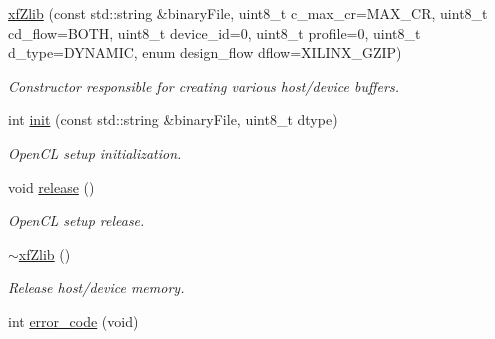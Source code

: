 \begin{DoxyCompactItemize}
\item 
\hypertarget{classxf_1_1compression_1_1xfZlib_a7712b200970e31a07526a43b40661dfe}{\hyperlink{classxf_1_1compression_1_1xfZlib_a7712b200970e31a07526a43b40661dfe}{xf\-Zlib} (const std\-::string \&binary\-File, uint8\-\_\-t c\-\_\-max\-\_\-cr=M\-A\-X\-\_\-\-C\-R, uint8\-\_\-t cd\-\_\-flow=B\-O\-T\-H, uint8\-\_\-t device\-\_\-id=0, uint8\-\_\-t profile=0, uint8\-\_\-t d\-\_\-type=D\-Y\-N\-A\-M\-I\-C, enum design\-\_\-flow dflow=X\-I\-L\-I\-N\-X\-\_\-\-G\-Z\-I\-P)}\label{classxf_1_1compression_1_1xfZlib_a7712b200970e31a07526a43b40661dfe}

\begin{DoxyCompactList}\small\item\em Constructor responsible for creating various host/device buffers. \end{DoxyCompactList}\item 
int \hyperlink{classxf_1_1compression_1_1xfZlib_a87f13a66b1928934295c46677666fabe}{init} (const std\-::string \&binary\-File, uint8\-\_\-t dtype)
\begin{DoxyCompactList}\small\item\em Open\-C\-L setup initialization. \end{DoxyCompactList}\item 
\hypertarget{classxf_1_1compression_1_1xfZlib_a161a134c573011f422026e83597b96b3}{void \hyperlink{classxf_1_1compression_1_1xfZlib_a161a134c573011f422026e83597b96b3}{release} ()}\label{classxf_1_1compression_1_1xfZlib_a161a134c573011f422026e83597b96b3}

\begin{DoxyCompactList}\small\item\em Open\-C\-L setup release. \end{DoxyCompactList}\item 
\hypertarget{classxf_1_1compression_1_1xfZlib_a6904dbfc6bf5a6f9917fb727ed5e391d}{\hyperlink{classxf_1_1compression_1_1xfZlib_a6904dbfc6bf5a6f9917fb727ed5e391d}{$\sim$xf\-Zlib} ()}\label{classxf_1_1compression_1_1xfZlib_a6904dbfc6bf5a6f9917fb727ed5e391d}

\begin{DoxyCompactList}\small\item\em Release host/device memory. \end{DoxyCompactList}\item 
\hypertarget{classxf_1_1compression_1_1xfZlib_a287855eea3200b5fb64a09bce2e19f67}{int \hyperlink{classxf_1_1compression_1_1xfZlib_a287855eea3200b5fb64a09bce2e19f67}{error\-\_\-code} (void)}\label{classxf_1_1compression_1_1xfZlib_a287855eea3200b5fb64a09bce2e19f67}


\end{DoxyCompactItemize}
